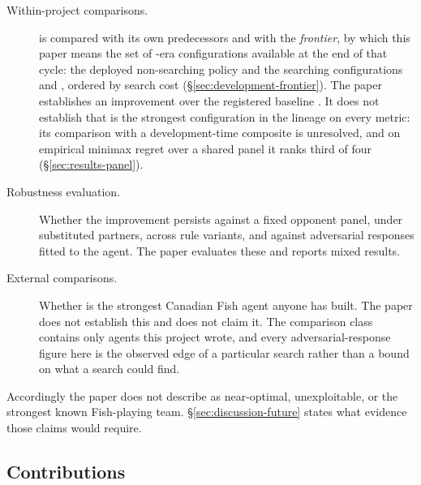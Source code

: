 \begin{description}
\item[Within-project comparisons.] \sestina{} is compared with its own predecessors and with the
  \emph{\vsix{} frontier}, by which this paper means the set of \vsix{}-era configurations available
  at the end of that cycle: the deployed non-searching policy and the searching configurations
  \fcheap{} and \fmid{}, ordered by search cost (\S\ref{sec:development-frontier}). The paper
  establishes an improvement over the registered baseline \fcheap{}. It does not establish that
  \sestina{} is the strongest configuration in the lineage on every metric: its comparison with a
  development-time composite is unresolved, and on empirical minimax regret over a shared panel it
  ranks third of four (\S\ref{sec:results-panel}).
\item[Robustness evaluation.] Whether the improvement persists against a fixed opponent panel, under
  substituted partners, across rule variants, and against adversarial responses fitted to the
  agent. The paper evaluates these and reports mixed results.
\item[External comparisons.] Whether \sestina{} is the strongest Canadian Fish agent anyone has
  built. The paper does not establish this and does not claim it. The comparison class contains only
  agents this project wrote, and every adversarial-response figure here is the observed edge of a
  particular search rather than a bound on what a search could find.
\end{description}

Accordingly the paper does not describe \sestina{} as near-optimal, unexploitable, or the
strongest known Fish-playing team. \S\ref{sec:discussion-future} states what evidence those claims
would require.

\subsection{Contributions}
\label{sec:intro-contributions}

